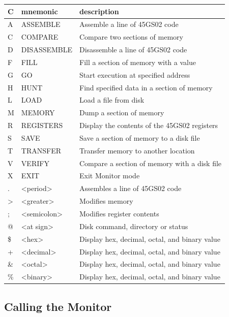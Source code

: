 {
\ttfamily
\setlength{\tabcolsep}{1mm}
\begin{center}
\begin{tabular}{|l|l|l|}
\hline
C & mnemonic & description \\
\hline
A &     ASSEMBLE        & Assemble a line of 45GS02 code\\
C &     COMPARE         & Compare two sections of memory\\
D &     DISASSEMBLE     & Disassemble a line of 45GS02 code\\
F &     FILL            & Fill a section of memory with a value \\
G &     GO              & Start execution at specified address\\
H &     HUNT            & Find specified data in a section of memory\\
L &     LOAD            & Load a file from disk\\
M &     MEMORY          & Dump a section of memory\\
R &     REGISTERS       & Display the contents of the 45GS02 registers\\
S &     SAVE            & Save a section of memory to a disk file\\
T &     TRANSFER        & Transfer memory to another location\\
V &     VERIFY          & Compare a section of memory with a disk file\\
X &     EXIT            & Exit Monitor mode\\
\hline
 . &     <period>        & Assembles a line of 45GS02 code\\
 > &     <greater>       & Modifies memory\\
 ; &     <semicolon>     & Modifies register contents\\
 @ &     <at sign>       & Disk command, directory or status\\
\hline
\$ &     <hex>           & Display hex, decimal, octal, and binary value \\
 + &     <decimal>       & Display hex, decimal, octal, and binary value\\
\& &     <octal>         & Display hex, decimal, octal, and binary value\\
\% &     <binary>        & Display hex, decimal, octal, and binary value\\
\hline
\end{tabular}
\end{center}
}

\subsection {Calling the Monitor}

